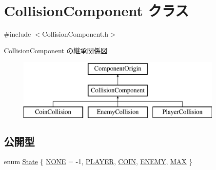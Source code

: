 \hypertarget{class_collision_component}{}\section{Collision\+Component クラス}
\label{class_collision_component}


{\ttfamily \#include $<$Collision\+Component.\+h$>$}

Collision\+Component の継承関係図\begin{figure}[H]
\begin{center}
\leavevmode
\includegraphics[height=3.000000cm]{class_collision_component}
\end{center}
\end{figure}
\subsection*{公開型}
\begin{DoxyCompactItemize}
\item 
enum \mbox{\hyperlink{class_collision_component_a91ba750c14ccd0f4857f0302f06084c6}{State}} \{ \newline
\mbox{\hyperlink{class_collision_component_a91ba750c14ccd0f4857f0302f06084c6a1d2ccb05204951a05e26685ba92f07cb}{N\+O\+NE}} = -\/1, 
\mbox{\hyperlink{class_collision_component_a91ba750c14ccd0f4857f0302f06084c6a3c8b928a9ddee0f71d5fff073c275d95}{P\+L\+A\+Y\+ER}}, 
\mbox{\hyperlink{class_collision_component_a91ba750c14ccd0f4857f0302f06084c6af5c676cd6f121bf0c269221b9746fbf2}{C\+O\+IN}}, 
\mbox{\hyperlink{class_collision_component_a91ba750c14ccd0f4857f0302f06084c6acdee26a37ba5cfc5292266887f637d40}{E\+N\+E\+MY}}, 
\newline
\mbox{\hyperlink{class_collision_component_a91ba750c14ccd0f4857f0302f06084c6a3441d773723b25dedbc6ce5c3b99dc36}{M\+AX}}
 \}
\end{DoxyCompactItemize}
